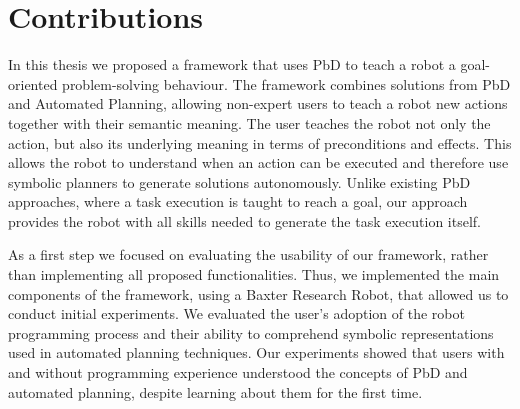 \section{Contributions}
In this thesis we proposed a framework that uses PbD to teach a robot a goal-oriented problem-solving behaviour.
The framework combines solutions from PbD and Automated Planning, allowing non-expert users to teach a robot new actions together with their semantic meaning.
The user teaches the robot not only the action, but also its underlying meaning in terms of preconditions and effects.
This allows the robot to understand when an action can be executed and therefore use symbolic planners to generate solutions autonomously.
Unlike existing PbD approaches, where a task execution is taught to reach a goal, our approach provides the robot with all skills needed to generate the task execution itself.

As a first step we focused on evaluating the usability of our framework, rather than implementing all proposed functionalities.
Thus, we implemented the main components of the framework, using a Baxter Research Robot, that allowed us to conduct initial experiments.
We evaluated the user's adoption of the robot programming process and their ability to comprehend symbolic representations used in automated planning techniques.
Our experiments showed that users with and without programming experience understood the concepts of PbD and automated planning, despite learning about them for the first time.

